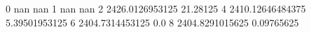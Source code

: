 0 nan nan
1 nan nan
2 2426.0126953125 21.28125
4 2410.12646484375 5.39501953125
6 2404.7314453125 0.0
8 2404.8291015625 0.09765625
